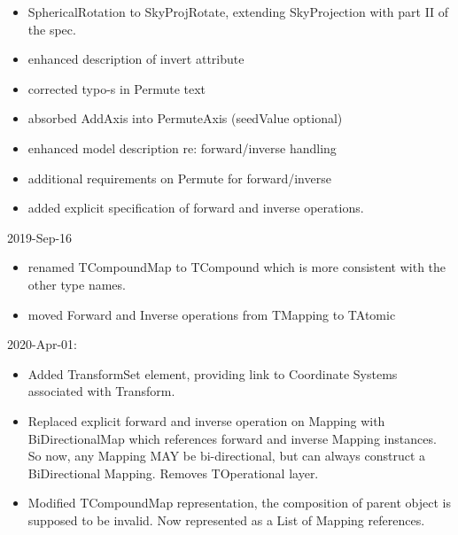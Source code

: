 \documentclass[11pt,a4paper]{ivoa}
\begin{document}
\begin{itemize}
\item SphericalRotation to SkyProjRotate, extending SkyProjection with part II of the spec.
\item enhanced description of invert attribute
\item corrected typo-s in Permute text
\item absorbed AddAxis into PermuteAxis (seedValue optional)
\item enhanced model description re: forward/inverse handling
\item additional requirements on Permute for forward/inverse
\item added explicit specification of forward and inverse operations.
\end{itemize}
2019-Sep-16
\begin{itemize}
\item renamed TCompoundMap to TCompound which is more consistent with the other type names.
\item moved Forward and Inverse operations from TMapping to TAtomic
\end{itemize}
2020-Apr-01:
\begin{itemize}
\item Added TransformSet element, providing link to Coordinate Systems associated with Transform.
\item Replaced explicit forward and inverse operation on Mapping with BiDirectionalMap which references forward and inverse Mapping instances.  So now, any Mapping MAY be bi-directional, but can always construct a BiDirectional Mapping.  Removes TOperational layer.
\item Modified TCompoundMap representation, the composition of parent object is supposed to be invalid.  Now represented as a List of Mapping references.
\end{itemize}






\pagebreak

\end{document}
